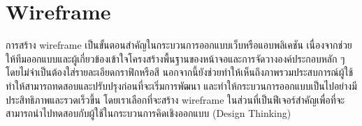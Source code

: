
\section{Wireframe}
การสร้าง wireframe เป็นขั้นตอนสำคัญในกระบวนการออกแบบเว็บหรือแอบพลิเคชัน เนื่องจากช่วยให้ทีมออกแบบและผู้เกี่ยวข้องเข้าใจโครงสร้างพื้นฐานของหน้าจอและการจัดวางองค์ประกอบหลัก ๆ โดยไม่จำเป็นต้องใส่รายละเอียดกราฟิกหรือสี นอกจากนี้ยังช่วยทำให้เห็นถึงภาพรวมประสบการณ์ผู้ใช้
ทำให้สามารถทดสอบและปรับปรุงก่อนที่จะเริ่มการพัฒนา และทำให้กระบวนการออกแบบเป็นไปอย่างมีประสิทธิภาพและรวดเร็วขึ้น โดยเราเลือกที่จะสร้าง wireframe ในส่วนที่เป็นฟีเจอร์สำคัญเพื่อที่จะสามารถนำไปทดสอบกับผู้ใช้ในกระบวนการคิดเชิงออกแบบ (Design Thinking)
